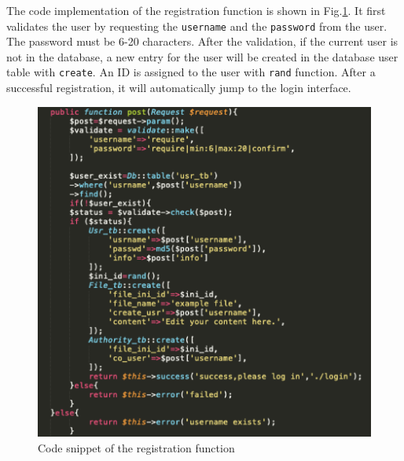 \noindent The code implementation of the registration function is shown in Fig.\ref{png1}. It first validates the user by requesting the \texttt{username} and the \texttt{password} from the user. The password must be 6-20 characters. After the validation, if the current user is not in the database, a new entry for the user will be created in the database user table with \texttt{create}. An ID is assigned to the user with \texttt{rand} function. After a successful registration, it will automatically jump to the login interface.

\begin{figure}[H]
  \centering
  \includegraphics[width=.8\textwidth]{register.png} %
  \caption{Code snippet of the registration function} %
  \label{png1} %
\end{figure}


